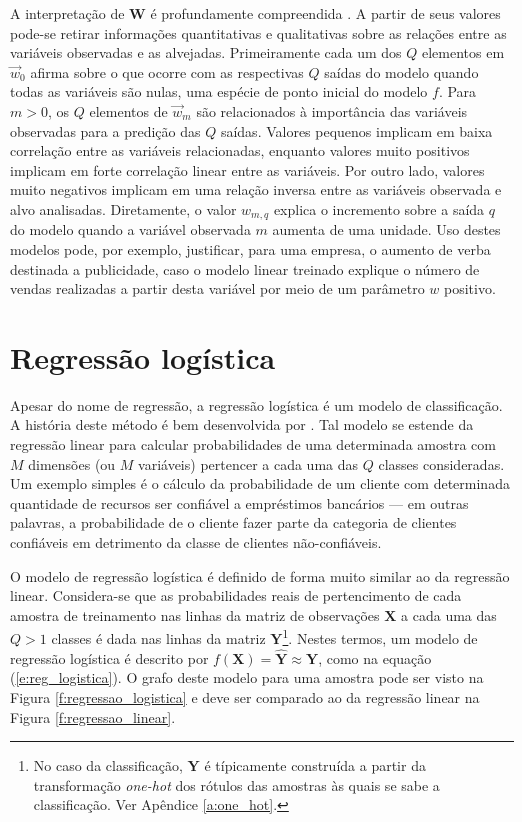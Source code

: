     A interpretação de $\boldsymbol{W}$ é profundamente compreendida . A partir de seus valores pode-se retirar informações quantitativas e qualitativas sobre as relações entre as variáveis observadas e as alvejadas. Primeiramente cada um dos $Q$ elementos em $\vec{w}_0$ afirma sobre o que ocorre com as respectivas $Q$ saídas do modelo quando todas as variáveis são nulas, uma espécie de ponto inicial do modelo $f$. Para $m>0$, os $Q$ elementos de $\vec{w}_m$ são relacionados à importância das variáveis observadas para a predição das $Q$ saídas. Valores pequenos implicam em baixa correlação entre as variáveis relacionadas, enquanto valores muito positivos implicam em forte correlação linear entre as variáveis. Por outro lado, valores muito negativos implicam em uma relação inversa entre as variáveis observada e alvo analisadas. Diretamente, o valor $w_{m,q}$ explica o incremento sobre a saída $q$ do modelo quando a variável observada $m$ aumenta de uma unidade. Uso destes modelos pode, por exemplo, justificar, para uma empresa, o aumento de verba destinada a publicidade, caso o modelo linear treinado explique o número de vendas realizadas a partir desta variável por meio de um parâmetro $w$ positivo.

  \section{Regressão logística}

    Apesar do nome de regressão, a regressão logística é um modelo de classificação. A história deste método é bem desenvolvida por . Tal modelo se estende da regressão linear para calcular probabilidades de uma determinada amostra com $M$ dimensões (ou $M$ variáveis) pertencer a cada uma das $Q$ classes consideradas. Um exemplo simples é o cálculo da probabilidade de um cliente com determinada quantidade de recursos ser confiável a empréstimos bancários --- em outras palavras, a probabilidade de o cliente fazer parte da categoria de clientes confiáveis em detrimento da classe de clientes não-confiáveis.

    O modelo de regressão logística é definido de forma muito similar ao da regressão linear. Considera-se que as probabilidades reais de pertencimento de cada amostra de treinamento nas linhas da matriz de observações $\boldsymbol{X}$ a cada uma das $Q>1$ classes é dada nas linhas da matriz $\boldsymbol{Y}$\footnote{No caso da classificação, $\boldsymbol{Y}$ é típicamente construída a partir da transformação \textit{one-hot} dos rótulos das amostras às quais se sabe a classificação. Ver Apêndice \ref{a:one_hot}.}. Nestes termos, um modelo de regressão logística é descrito por $f(\boldsymbol{X}) = \boldsymbol{\hat{Y}} \approx \boldsymbol{Y}$, como na equação (\ref{e:reg_logistica}). O grafo deste modelo para uma amostra pode ser visto na Figura \ref{f:regressao_logistica} e deve ser comparado ao da regressão linear na Figura \ref{f:regressao_linear}.

